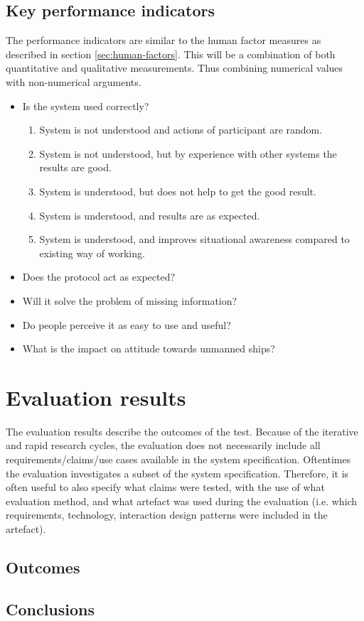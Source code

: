 \subsection{Key performance indicators}
The performance indicators are similar to the human factor measures as described in section \ref{sec:human-factors}. This will be a combination of both quantitative and qualitative measurements. Thus combining numerical values with non-numerical arguments.
\begin{itemize}
	\item Is the system used correctly? 
	\begin{enumerate}
		\item System is not understood and actions of participant are random.
		\item System is not understood, but by experience with other systems the results are good.
		\item System is understood, but does not help to get the good result.
		\item System is understood, and results are as expected.
		\item System is understood, and improves situational awareness compared to existing way of working.
	\end{enumerate}
	\item Does the protocol act as expected?
	\item Will it solve the problem of missing information?
	\item Do people perceive it as easy to use and useful?
	\item What is the impact on attitude towards unmanned ships?
\end{itemize}

\section{Evaluation results}
The evaluation results describe the outcomes of the test. Because of the iterative and rapid research cycles, the evaluation does not necessarily include all requirements/claims/use cases available in the system specification. Oftentimes the evaluation investigates a subset of the system specification. Therefore, it is often useful to also specify what claims were tested, with the use of what evaluation method, and what artefact was used during the evaluation (i.e. which requirements, technology, interaction design patterns were included in the artefact).

\subsection{Outcomes}

\subsection{Conclusions}